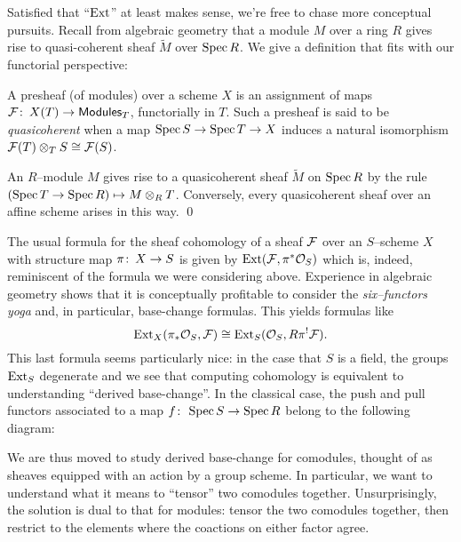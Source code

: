 Satisfied that ``$\operatorname{Ext}$'' at least makes sense, we're free to chase more conceptual pursuits.  Recall from algebraic geometry that a module $M$ over a ring $R$ gives rise to quasi-coherent sheaf $\widetilde{M}$ over $\operatorname{Spec} R$.  We give a definition that fits with our functorial perspective:
\begin{definition}
A presheaf (of modules) over a scheme $X$ is an assignment of maps $\mathcal{F}\colon\thinspace X(T) \to \mathsf{Modules}_T$, functorially in $T$.   Such a presheaf is said to be \textit{quasicoherent} when a map $\operatorname{Spec} S \to \operatorname{Spec} T \to X$ induces a natural isomorphism $\mathcal{F}(T) \otimes_T S \cong \mathcal{F}(S)$.
\end{definition}

\begin{lemma}
An $R$--module $M$ gives rise to a quasicoherent sheaf $\widetilde M$ on $\operatorname{Spec} R$ by the rule $(\operatorname{Spec} T \to \operatorname{Spec} R) \mapsto M \otimes_R T$.  Conversely, every quasicoherent sheaf over an affine scheme arises in this way.  \qed
\end{lemma}

The usual formula for the sheaf cohomology of a sheaf $\mathcal{F}$ over an $S$--scheme $X$ with structure map $\pi\colon\thinspace X \to S$ is given by $\operatorname{Ext}(\mathcal{F}, \pi^* \mathcal{O}_S)$ which is, indeed, reminiscent of the formula we were considering above.  Experience in algebraic geometry shows that it is conceptually profitable to consider the \emph{six--functors yoga} and, in particular, base-change formulas.  This yields formulas like \[\operatorname{Ext}_X(\pi_* \mathcal{O}_S, \mathcal{F}) \cong \operatorname{Ext}_S(\mathcal{O}_S, R\pi^! \mathcal{F}).\]  This last formula seems particularly nice: in the case that $S$ is a field, the groups $\operatorname{Ext}_S$ degenerate and we see that computing cohomology is equivalent to understanding ``derived base-change''.  In the classical case, the push and pull functors associated to a map $f\colon\thinspace \operatorname{Spec} S \to \operatorname{Spec} R$ belong to the following diagram:
\begin{center}
\end{center}
We are thus moved to study derived base-change for comodules, thought of as sheaves equipped with an action by a group scheme.  In particular, we want to understand what it means to ``tensor'' two comodules together.  Unsurprisingly, the solution is dual to that for modules: tensor the two comodules together, then restrict to the elements where the coactions on either factor agree.

